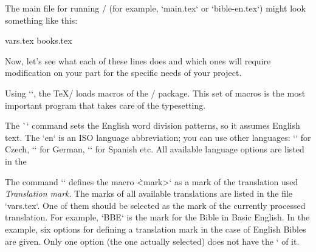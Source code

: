 The main file for running \OpBible/ (for example, `main.tex` or `bible-en.tex`) might look something like this:

\begtt
\load[opbible] %
\enlang %

\def\tmark {BBE}      %

 {vars.tex}  %
 {books.tex} %

\def\txsfile {sources/\tmark-\amark.txs} %
\def\fmtfile {formats/fmt-\tmark-\amark.tex} %
\def\notesfile {notes/notes-\amark.tex} %
\def\introfile {others/intro-\amark.tex} %
\def\articlefile {others/articles-\amark.tex} %

\def\printedbooks {%
 Gen Exod Lev Num Deut Josh Judg Ruth 1Sam 2Sam 1Kgs 2Kgs 1Chr 2Chr Ezra Neh Esth Job Ps 
 Prov Eccl Song Isa Jer Lam Ezek Dan Hos Joel Amos Obad Jonah Mic Nah Hab Zeph Hag Zech Mal    
 Matt Mark Luke John Acts Rom 1Cor 2Cor Gal Eph Phil Col 1Thess 2Thess 1Tim 2Tim Titus  
 Phlm Heb Jas 1Pet 2Pet 1John 2John 3John Jude Rev
}

\processbooks %
\bye
\endtt

Now, let's see what each of these lines does and which ones will require modification on your part 
for the specific needs of your project.

Using `\load[opbible]`,  the \TeX/ loads macros of the \OpBible/ package. 
This set of macros is the most important program that takes care of the 
typesetting.

The \`\enlang` command sets the English word division patterns, so it assumes English
text. The `en` is an ISO language abbreviation; you can use other languages:
`\cslang` for Czech, `\delang` for German, `\eslang` for Spanish
etc. All available language options are listed in the 

The command `\def\tmark {<mark>}` defines the macro \`\tmark` as a mark
of the translation used {\em Translation mark}. The marks of all available translations are listed 
in the file `vars.tex`. 
One of them should be selected as the mark of the currently processed
translation. For example, `BBE` is the mark for the Bible in Basic English.
In the example, six options for defining a translation mark in the case of English Bibles are 
given. Only one option (the one actually selected) does not have the `%
of it. 

